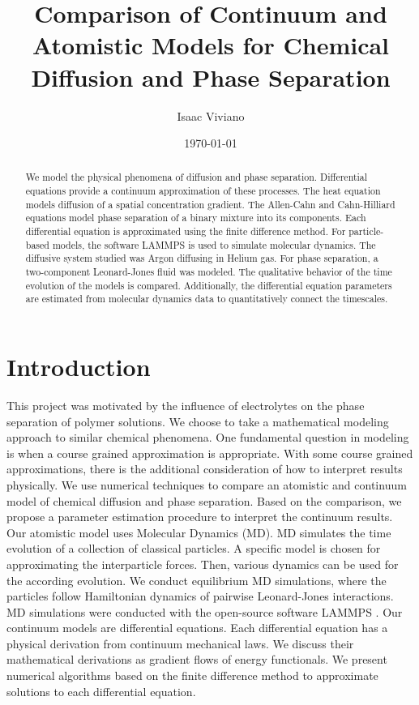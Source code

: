 \documentclass[12pt, reqno]{report}
\theoremstyle{definition}
\theoremstyle{remark}
\begin{document}
\title{Comparison of Continuum and Atomistic Models for Chemical Diffusion and Phase Separation}
\date{\today}
\author{Isaac Viviano}

\maketitle

\begin{abstract}

    We model the physical phenomena of diffusion and phase separation. Differential equations provide a continuum approximation of these processes. The heat equation models diffusion of a spatial concentration gradient. The Allen-Cahn and Cahn-Hilliard equations model phase separation of a binary mixture into its components. Each differential equation is approximated using the finite difference method. For particle-based models, the software LAMMPS is used to simulate molecular dynamics. The diffusive system studied was Argon diffusing in Helium gas. For phase separation, a two-component Leonard-Jones fluid was modeled. The qualitative behavior of the time evolution of the models is compared. Additionally, the differential equation parameters are estimated from molecular dynamics data to quantitatively connect the timescales.

\end{abstract}

\tableofcontents

\chapter{Introduction} \label{sec_intro}

This project was motivated by the influence of electrolytes on the phase separation of polymer solutions. 
We choose to take a mathematical modeling approach to similar chemical phenomena.
One fundamental question in modeling is when a course grained approximation is appropriate.
With some course grained approximations, there is the additional consideration of how to interpret results physically.
We use numerical techniques to compare an atomistic and continuum model of chemical diffusion and phase separation.
Based on the comparison, we propose a parameter estimation procedure to interpret the continuum results.
Our atomistic model uses Molecular Dynamics (MD). 
MD simulates the time evolution of a collection of classical particles.
A specific model is chosen for approximating the interparticle forces. 
Then, various dynamics can be used for the according evolution.
We conduct equilibrium MD simulations, where the particles follow Hamiltonian dynamics of pairwise Leonard-Jones interactions.
MD simulations were conducted with the open-source software LAMMPS \cite{LAMMPS}.
Our continuum models are differential equations.
Each differential equation has a physical derivation from continuum mechanical laws.
We discuss their mathematical derivations as gradient flows of energy functionals.
We present numerical algorithms based on the finite difference method to approximate solutions to each differential equation.
\end{document}
